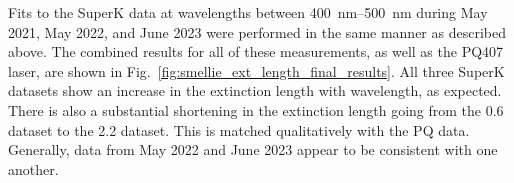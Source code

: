 

Fits to the SuperK data at wavelengths between \SIrange{400}{500}{\nm} during May 2021, May 2022, and June 2023 were performed in the same manner as described above. The combined results for all of these measurements, as well as the PQ407 laser, are shown in Fig.~\ref{fig:smellie_ext_length_final_results}. All three SuperK datasets show an increase in the extinction length with wavelength, as expected. There is also a substantial shortening in the extinction length going from the \SI{0.6}{\gpl} dataset to the \SI{2.2}{\gpl} dataset. This is matched qualitatively with the PQ data. Generally, data from May 2022 and June 2023 appear to be consistent with one another.

